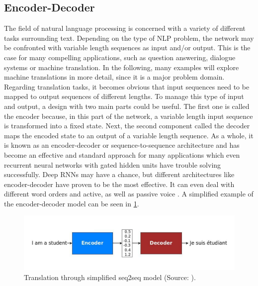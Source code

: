 \documentclass[
]{krantz}
\begin{document}
\hypertarget{encoder-decoder}{%
\subsection{Encoder-Decoder}\label{encoder-decoder}}

The field of natural language processing is concerned with a variety of
different tasks surrounding text. Depending on the type of NLP problem,
the network may be confronted with variable length sequences as input
and/or output. This is the case for many compelling applications, such
as question answering, dialogue systems or machine translation. In the
following, many examples will explore machine translations in more
detail, since it is a major problem domain. Regarding translation tasks,
it becomes obvious that input sequences need to be mapped to output
sequences of different lengths. To manage this type of input and output,
a design with two main parts could be useful. The first one is called
the encoder because, in this part of the network, a variable length
input sequence is transformed into a fixed state. Next, the
second component called the decoder maps the encoded state to an output
of a variable length sequence. As a whole, it is known as an
encoder-decoder or sequence-to-sequence architecture and has become an
effective and standard approach for many applications which even
recurrent neural networks with gated hidden units have trouble solving
successfully. Deep RNNs may have a chance, but different architectures
like encoder-decoder have proven to be the most effective. It can even
deal with different word orders and active, as well as passive voice
\citep{Sutskever2014}. A simplified example of the encoder-decoder model
can be seen in \ref{fig:arch1Encdec}.

\begin{figure}

{\centering \includegraphics[width=0.85\linewidth]{./figures/01-01-nlp/encdec_arch1_deepl} 

}

\caption{Translation through simplified seq2seq model (Source: \citet{Manning2022}).}\label{fig:arch1Encdec}
\end{figure}
\end{document}

